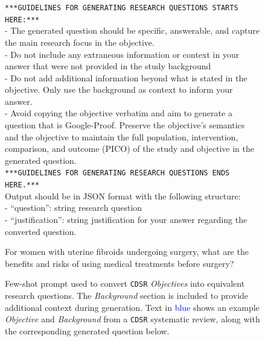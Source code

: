 \documentclass{article}
\begin{document}
\begin{figure}[h!]
\begin{small}
\begin{tcolorbox}[
    colback=gray!5,
    colframe=black,
    width=\linewidth,
    arc=2mm,
    boxrule=0.5pt,
    title=\textbf{Question Generation Prompt}
]
\texttt{***GUIDELINES FOR GENERATING RESEARCH QUESTIONS STARTS HERE:***}\\
- The generated question should be specific, answerable, and capture the main research focus in the objective.\\
- Do not include any extraneous information or context in your answer that were not provided in the study background\\
- Do not add additional information beyond what is stated in the objective. Only use the background as context to inform your answer.\\
- Avoid copying the objective verbatim and aim to generate a question that is Google-Proof. Preserve the objective's semantics and the objective to maintain the full population, intervention, comparison, and outcome (PICO) of the study and objective in the generated question.\\
\texttt{***GUIDELINES FOR GENERATING RESEARCH QUESTIONS ENDS HERE.***}\\

Output should be in JSON format with the following structure:\\
- ``question'': string research question\\
- ``justification'': string justification for your answer regarding the converted question.\\
\end{tcolorbox}
\begin{tcolorbox}[
    colback=gray!5,
    colframe=black,
    width=\linewidth,
    arc=2mm,
    boxrule=0.5pt,
    title=\textbf{Example Generated Question}
]
For women with uterine fibroids undergoing surgery, what are the benefits and risks of using medical treatments before surgery?
\end{tcolorbox}

\caption{Few-shot prompt used to convert \texttt{CDSR} \textit{Objectives} into equivalent research questions. The \textit{Background} section is included to provide additional context during generation. Text in \textcolor{blue}{blue} shows an example \textit{Objective} and \textit{Background} from a \texttt{CDSR} systematic review, along with the corresponding generated question below.}
\label{fig:question-generation-prompt}
\end{small}
\end{figure}
\end{document}
